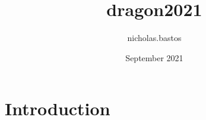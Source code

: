 \documentclass{article}
\title{dragon2021}
\author{nicholas.bastos }
\date{September 2021}
\begin{document}
\maketitle

\section{Introduction}
\end{document}
